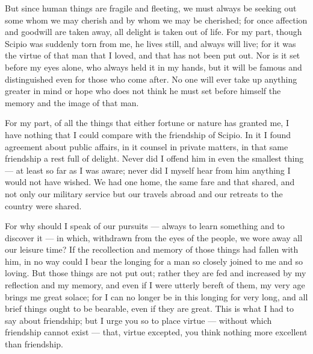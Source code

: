  But since human things are fragile and fleeting, we must always be seeking out some whom we may cherish and by whom we may be cherished; for once affection and goodwill are taken away, all delight is taken out of life. For my part, though Scipio was suddenly torn from me, he lives still, and always will live; for it was the virtue of that man that I loved, and that has not been put out. Nor is it set before my eyes alone, who always held it in my hands, but it will be famous and distinguished even for those who come after. No one will ever take up anything greater in mind or hope who does not think he must set before himself the memory and the image of that man.

 For my part, of all the things that either fortune or nature has granted me, I have nothing that I could compare with the friendship of Scipio. In it I found agreement about public affairs, in it counsel in private matters, in that same friendship a rest full of delight. Never did I offend him in even the smallest thing — at least so far as I was aware; never did I myself hear from him anything I would not have wished. We had one home, the same fare and that shared, and not only our military service but our travels abroad and our retreats to the country were shared.

 For why should I speak of our pursuits — always to learn something and to discover it — in which, withdrawn from the eyes of the people, we wore away all our leisure time? If the recollection and memory of those things had fallen with him, in no way could I bear the longing for a man so closely joined to me and so loving. But those things are not put out; rather they are fed and increased by my reflection and my memory, and even if I were utterly bereft of them, my very age brings me great solace; for I can no longer be in this longing for very long, and all brief things ought to be bearable, even if they are great. This is what I had to say about friendship; but I urge you so to place virtue — without which friendship cannot exist — that, virtue excepted, you think nothing more excellent than friendship.
